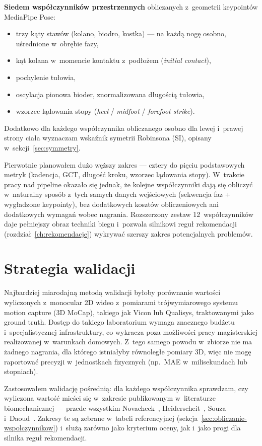 \textbf{Siedem współczynników przestrzennych} obliczanych z~geometrii keypointów MediaPipe Pose:
\begin{itemize}
    \item trzy kąty stawów (kolano, biodro, kostka) --- na każdą nogę osobno, uśrednione w~obrębie fazy,
    \item kąt kolana w~momencie kontaktu z~podłożem (\textit{initial contact}),
    \item pochylenie tułowia,
    \item oscylacja pionowa bioder, znormalizowana długością tułowia,
    \item wzorzec lądowania stopy (\textit{heel} / \textit{midfoot} / \textit{forefoot strike}).
\end{itemize}

Dodatkowo dla każdego współczynnika obliczanego osobno dla lewej i~prawej strony ciała wyznaczam wskaźnik symetrii Robinsona (SI), opisany w~sekcji~\ref{sec:symmetry}.

Pierwotnie planowałem dużo węższy zakres --- cztery do pięciu podstawowych metryk (kadencja, GCT, długość kroku, wzorzec lądowania stopy). W~trakcie pracy nad pipeline okazało się jednak, że kolejne współczynniki dają się obliczyć w~naturalny sposób z~tych samych danych wejściowych (sekwencja faz + wygładzone keypointy), bez dodatkowych kosztów obliczeniowych ani dodatkowych wymagań wobec nagrania. Rozszerzony zestaw 12~współczynników daje pełniejszy obraz techniki biegu i~pozwala silnikowi reguł rekomendacji (rozdział~\ref{ch:rekomendacje}) wykrywać szerszy zakres potencjalnych problemów.

\section{Strategia walidacji}
\label{sec:strategia-walidacji}

Najbardziej miarodajną metodą walidacji byłoby porównanie wartości wyliczonych z~monocular 2D wideo z~pomiarami trójwymiarowego systemu motion capture (3D MoCap), takiego jak Vicon lub Qualisys, traktowanymi jako ground truth. Dostęp do takiego laboratorium wymaga znacznego budżetu i~specjalistycznej infrastruktury, co wykracza poza możliwości pracy magisterskiej realizowanej w~warunkach domowych. Z~tego samego powodu w~zbiorze nie ma żadnego nagrania, dla którego istniałyby równoległe pomiary 3D, więc nie mogę raportować precyzji w~jednostkach fizycznych (np.~MAE w~milisekundach lub stopniach).

Zastosowałem walidację pośrednią: dla każdego współczynnika sprawdzam, czy wyliczona wartość mieści się w~zakresie publikowanym w~literaturze biomechanicznej --- przede wszystkim Novacheck~\cite{novacheck1998}, Heiderscheit~\cite{heiderscheit2011}, Souza~\cite{souza2016} i~Daoud~\cite{daoud2012}. Zakresy te są zebrane w~tabeli referencyjnej (sekcja~\ref{sec:obliczanie-wspolczynnikow}) i~służą zarówno jako kryterium oceny, jak i~jako progi dla silnika reguł rekomendacji.

